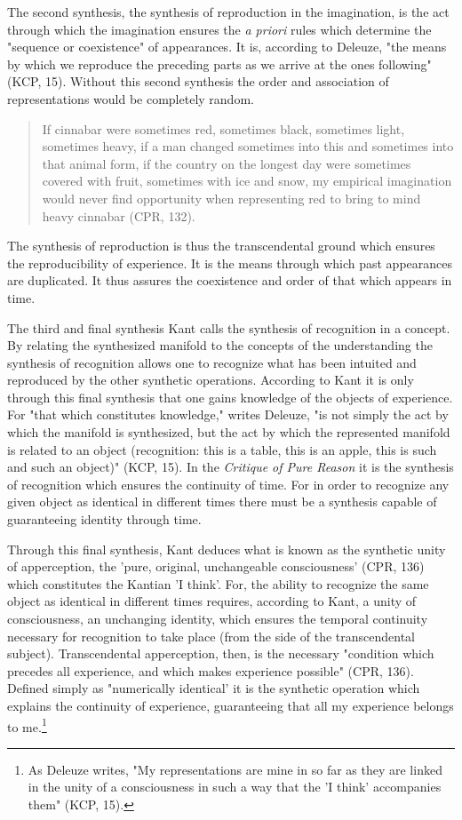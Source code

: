 The second synthesis, the synthesis of reproduction in the imagination, is the act through which the imagination ensures the \textit{a priori} rules which determine the "sequence or coexistence" of appearances. It is, according to Deleuze, "the means by which we reproduce the preceding parts as we arrive at the ones following" (KCP, 15). Without this second synthesis the order and association of representations would be completely random.

\begin{quote}
    If cinnabar were sometimes red, sometimes black, sometimes light, sometimes heavy, if a man changed sometimes into this and sometimes into that animal form, if the country on the longest day were sometimes covered with fruit, sometimes with ice and snow, my empirical imagination would never find opportunity when representing red to bring to mind heavy cinnabar (CPR, 132).
\end{quote}

The synthesis of reproduction is thus the transcendental ground which ensures the reproducibility of experience. It is the means through which past appearances are duplicated. It thus assures the coexistence and order of that which appears in time.

The third and final synthesis Kant calls the synthesis of recognition in a concept. By relating the synthesized manifold to the concepts of the understanding the synthesis of recognition allows one to recognize what has been intuited and reproduced by the other synthetic operations. According to Kant it is only through this final synthesis that one gains knowledge of the objects of experience. For "that which constitutes knowledge," writes Deleuze, "is not simply the act by which the manifold is synthesized, but the act by which the represented manifold is related to an object (recognition: this is a table, this is an apple, this is such and such an object)" (KCP, 15). In the \textit{Critique of Pure Reason} it is the synthesis of recognition which ensures the continuity of time. For in order to recognize any given object as identical in different times there must be a synthesis capable of guaranteeing identity through time.

Through this final synthesis, Kant deduces what is known as the synthetic unity of apperception, the 'pure, original, unchangeable consciousness' (CPR, 136) which constitutes the Kantian 'I think'. For, the ability to recognize the same object as identical in different times requires, according to Kant, a unity of consciousness, an unchanging identity, which ensures the temporal continuity necessary for recognition to take place (from the side of the transcendental subject). Transcendental apperception, then, is the necessary "condition which precedes all experience, and which makes experience possible" (CPR, 136). Defined simply as "numerically identical' it is the synthetic operation which explains the continuity of experience, guaranteeing that all my experience belongs to me.\footnote{As Deleuze writes, "My representations are mine in so far as they are linked in the unity of a consciousness in such a way that the 'I think' accompanies them" (KCP, 15).}

